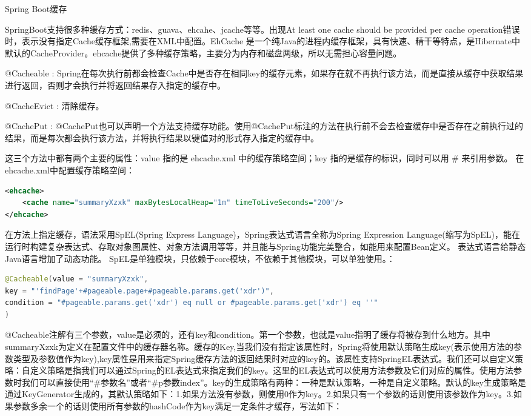 \documentclass[12pt]{book}
\makeatletter
\numberwithin{dummy}{section}
\theoremstyle{ocrenumbox}
\theoremstyle{blacknumex}
\theoremstyle{blacknumbox}
\theoremstyle{ocrenum}
\renewcommand{\subsection}{\@startsection {subsection}{2}{\z@}
	{-3ex \@plus -0.1ex \@minus -.4ex}
	{0.5ex \@plus.2ex }
	{\normalfont\sffamily\bfseries}}
\makeatother
\begin{document}
\subsection{Spring Boot缓存}

SpringBoot支持很多种缓存方式：redis、guava、ehcahe、jcache等等。出现At least one cache should be provided per cache operation错误时，表示没有指定Cache缓存框架,需要在XML中配置。EhCache 是一个纯Java的进程内缓存框架，具有快速、精干等特点，是Hibernate中默认的CacheProvider。ehcache提供了多种缓存策略，主要分为内存和磁盘两级，所以无需担心容量问题。

@Cacheable : Spring在每次执行前都会检查Cache中是否存在相同key的缓存元素，如果存在就不再执行该方法，而是直接从缓存中获取结果进行返回，否则才会执行并将返回结果存入指定的缓存中。 

@CacheEvict : 清除缓存。 

@CachePut : @CachePut也可以声明一个方法支持缓存功能。使用@CachePut标注的方法在执行前不会去检查缓存中是否存在之前执行过的结果，而是每次都会执行该方法，并将执行结果以键值对的形式存入指定的缓存中。 

这三个方法中都有两个主要的属性：value 指的是 ehcache.xml 中的缓存策略空间；key 指的是缓存的标识，同时可以用 \# 来引用参数。
在ehcache.xml中配置缓存策略空间：

\begin{lstlisting}[language=XML]
<ehcache>
	<cache name="summaryXzxk" maxBytesLocalHeap="1m" timeToLiveSeconds="200"/>
</ehcache>
\end{lstlisting}

在方法上指定缓存，语法采用SpEL(Spring Express Language)，Spring表达式语言全称为Spring Expression Language(缩写为SpEL)，能在运行时构建复杂表达式、存取对象图属性、对象方法调用等等，并且能与Spring功能完美整合，如能用来配置Bean定义。 表达式语言给静态Java语言增加了动态功能。
SpEL是单独模块，只依赖于core模块，不依赖于其他模块，可以单独使用。：

\begin{lstlisting}[language=Java]
@Cacheable(value = "summaryXzxk",
key = "'findPage'+#pageable.page+#pageable.params.get('xdr')",
condition = "#pageable.params.get('xdr') eq null or #pageable.params.get('xdr') eq ''"
)
\end{lstlisting}

@Cacheable注解有三个参数，value是必须的，还有key和condition。第一个参数，也就是value指明了缓存将被存到什么地方。其中summaryXzxk为定义在配置文件中的缓存器名称。缓存的Key,当我们没有指定该属性时，Spring将使用默认策略生成key(表示使用方法的参数类型及参数值作为key),key属性是用来指定Spring缓存方法的返回结果时对应的key的。该属性支持SpringEL表达式。我们还可以自定义策略：自定义策略是指我们可以通过Spring的EL表达式来指定我们的key。这里的EL表达式可以使用方法参数及它们对应的属性。使用方法参数时我们可以直接使用“\#参数名”或者“\#p参数index”。key的生成策略有两种：一种是默认策略，一种是自定义策略。默认的key生成策略是通过KeyGenerator生成的，其默认策略如下：1.如果方法没有参数，则使用0作为key。2.如果只有一个参数的话则使用该参数作为key。3.如果参数多余一个的话则使用所有参数的hashCode作为key满足一定条件才缓存，写法如下：
\end{document}
